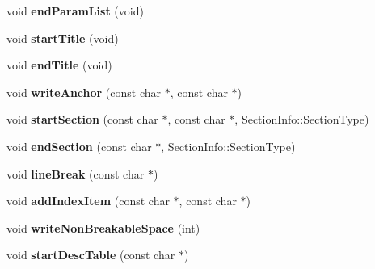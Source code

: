 \begin{DoxyCompactItemize}
\mbox{\label{class_docbook_generator_aa50cbefc868b784f670abeefe63a3134}} 
void {\bfseries end\+Param\+List} (void)
\item 
\mbox{\label{class_docbook_generator_a92ec864254dbcfc34f0f7e9bd7425ecf}} 
void {\bfseries start\+Title} (void)
\item 
\mbox{\label{class_docbook_generator_a86fa7cf7c97b19a93216b5819cb9f178}} 
void {\bfseries end\+Title} (void)
\item 
\mbox{\label{class_docbook_generator_a77af6fb2e87620e84ef1cbbcfd04e1fa}} 
void {\bfseries write\+Anchor} (const char $\ast$, const char $\ast$)
\item 
\mbox{\label{class_docbook_generator_a7c35ba06bbf1e151f55c9fa42f786f01}} 
void {\bfseries start\+Section} (const char $\ast$, const char $\ast$, Section\+Info\+::\+Section\+Type)
\item 
\mbox{\label{class_docbook_generator_aebe55441607d88540afdf1131452acb6}} 
void {\bfseries end\+Section} (const char $\ast$, Section\+Info\+::\+Section\+Type)
\item 
\mbox{\label{class_docbook_generator_a1d8531f44a63138f5c7ccabcf5b5da0b}} 
void {\bfseries line\+Break} (const char $\ast$)
\item 
\mbox{\label{class_docbook_generator_a310d8299b672cc6d24333129b069f028}} 
void {\bfseries add\+Index\+Item} (const char $\ast$, const char $\ast$)
\item 
\mbox{\label{class_docbook_generator_a90d3afc310288c35d48787bc84310ec7}} 
void {\bfseries write\+Non\+Breakable\+Space} (int)
\item 
\mbox{\label{class_docbook_generator_acaa3fba479216b81c56bf6875f479be1}} 
void {\bfseries start\+Desc\+Table} (const char $\ast$)
\item 
\mbox{\label{class_docbook_generator_abd3af9023fb73fc3332ca625afcc78a6}} 

\end{DoxyCompactItemize}
